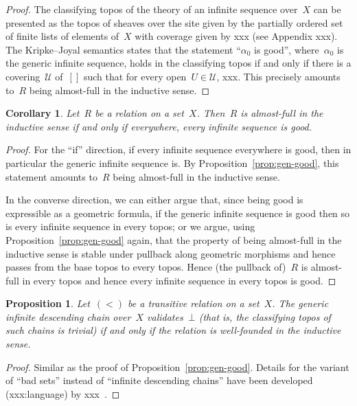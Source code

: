 \documentclass[oneside,reqno]{amsart}
\theoremstyle{definition}
\theoremstyle{plain}
\newtheorem{prop}[defn]{Proposition}
\newtheorem{cor}[defn]{Corollary}
\theoremstyle{remark}
\newcommand{\U}{\mathcal{U}}
\renewcommand{\_}{\mathpunct{.}\,}
\newcommand{\?}{\,{:}\,}
\begin{document}
\begin{proof}The classifying topos of the theory of an infinite sequence
over~$X$ can be presented as the topos of sheaves over the site given by the
partially ordered set of finite lists of elements of~$X$ with coverage given
by xxx (see Appendix xxx). The Kripke--Joyal semantics states that the
statement ``$\alpha_0$ is good'', where~$\alpha_0$ is the generic infinite
sequence, holds in the classifying topos if and only if there is a
covering~$\U$ of~$[]$ such that for every open~$U \in \U$, xxx. This precisely
amounts to~$R$ being almost-full in the inductive sense.
\end{proof}

\begin{cor}\label{cor:modal-good}Let~$R$ be a relation on a set~$X$. Then~$R$
is almost-full in the inductive sense if and only if everywhere, every infinite
sequence is good.\end{cor}

\begin{proof}For the ``if'' direction, if every infinite sequence everywhere is
good, then in particular the generic infinite sequence is. By
Proposition~\ref{prop:gen-good}, this statement amounts to~$R$ being
almost-full in the inductive sense.

In the converse direction, we can either argue that, since being good is
expressible as a geometric formula, if the generic infinite sequence is good
then so is every infinite sequence in every topos; or we argue, using
Proposition~\ref{prop:gen-good} again, that
the property of being almost-full in the inductive sense is stable
under pullback along geometric morphisms and hence passes from the base topos
to every topos. Hence (the pullback of)~$R$ is almost-full in every topos and
hence every infinite sequence in every topos is good.\end{proof}

\begin{prop}Let~$({<})$ be a transitive relation on a set~$X$. The generic
infinite descending chain over~$X$ validates~$\bot$ (that is, the classifying
topos of such chains is trivial) if and only if the relation is well-founded in
the inductive sense.\end{prop}

\begin{proof}Similar as the proof of Proposition~\ref{prop:gen-good}. Details
for the variant of ``bad sets'' instead of ``infinite descending chains'' have
been developed (xxx:language) by xxx~\cite{xxx}.\end{proof}
\end{document}
